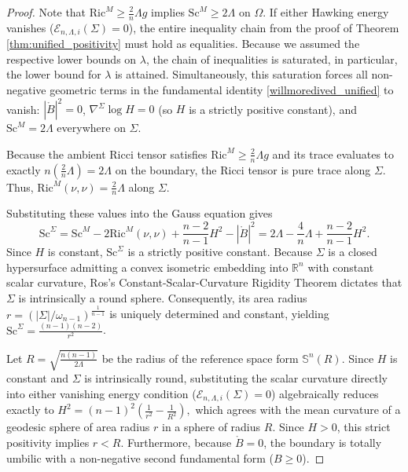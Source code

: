 \documentclass[12pt,a4paper]{amsart}
\theoremstyle{plain}
\theoremstyle{definition}
\begin{document}
\begin{proof}
Note that  $\mathrm{Ric}^M \ge \frac{2}{n}\Lambda g$ implies  $\mathrm{Sc}^M \ge 2\Lambda$  on $\Omega$. If either Hawking energy vanishes ($\mathcal{E}_{n,\Lambda,i}(\Sigma) = 0$), the entire inequality chain from the proof of Theorem \ref{thm:unified_positivity} must hold as  equalities. Because we assumed the respective lower bounds on $\lambda$, the chain of inequalities  is saturated, in particular, the lower bound for $\lambda$ is attained.  Simultaneously, this saturation forces all non-negative geometric terms in the fundamental identity \eqref{willmoredived_unified} to vanish: $|\mathring{B}|^2 = 0$, $\nabla^\Sigma \log H = 0$ (so $H$ is a strictly positive constant), and $\mathrm{Sc}^M = 2\Lambda$ everywhere on $\Sigma$. 

Because the ambient Ricci tensor satisfies $\mathrm{Ric}^M \ge \frac{2}{n}\Lambda g$ and its trace evaluates to exactly $n(\frac{2}{n}\Lambda) = 2\Lambda$ on the boundary, the Ricci tensor is  pure trace along $\Sigma$. Thus, $\mathrm{Ric}^M(\nu,\nu) = \frac{2}{n}\Lambda$ along $\Sigma$.

Substituting these values into the Gauss equation gives 
\begin{equation*}
    \mathrm{Sc}^{\Sigma} = \mathrm{Sc}^{M} - 2\mathrm{Ric}^M(\nu, \nu) + \frac{n-2}{n-1}H^2 - |\mathring{B}|^2 = 2\Lambda - \frac{4}{n}\Lambda + \frac{n-2}{n-1}H^2.
\end{equation*}
Since $H$ is constant, $\mathrm{Sc}^\Sigma$ is a strictly positive constant. Because $\Sigma$ is a closed hypersurface admitting a convex isometric embedding into $\mathbb{R}^n$ with constant scalar curvature, Ros's Constant-Scalar-Curvature Rigidity Theorem \cite{ros1988compact} dictates that $\Sigma$ is intrinsically a round sphere. Consequently, its area radius $r = \left(|\Sigma|/ \omega_{n-1} \right)^{\frac{1}{n-1}}$ is uniquely determined and constant, yielding $\mathrm{Sc}^\Sigma = \frac{(n-1)(n-2)}{r^2}$.



Let $R = \sqrt{\frac{n(n-1)}{2\Lambda}}$ be the radius of the reference space form $\mathbb{S}^n(R)$. Since $H$ is constant and $\Sigma$ is intrinsically round, substituting the scalar curvature directly into either vanishing energy condition ($\mathcal{E}_{n,\Lambda,i}(\Sigma) = 0$) algebraically reduces exactly to 
$H^2 = (n-1)^2\left(\frac{1}{r^2} - \frac{1}{R^2}\right),$ which agrees with the mean curvature of a geodesic sphere of  area radius $r$ in a sphere of radius $R$. Since $H > 0$, this strict positivity implies $r < R$. Furthermore, because $\mathring{B} = 0$, the boundary is totally umbilic with a non-negative second fundamental form ($B \ge 0$).



\end{proof}
\end{document}
